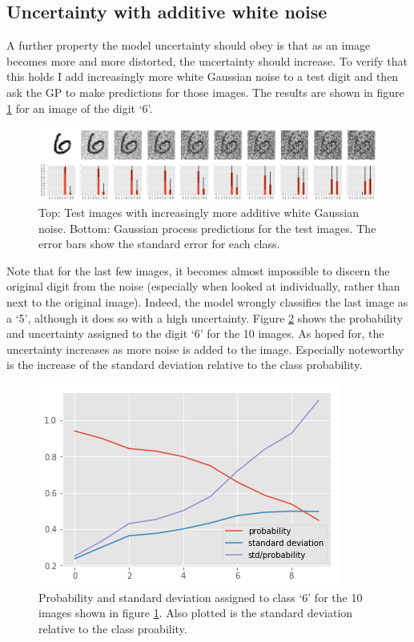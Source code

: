 \documentclass{article}
\begin{document}
\subsection{Uncertainty with additive white noise}
A further property the model uncertainty should obey is that as an image becomes more and more distorted, the uncertainty should increase. To verify that this holds I add increasingly more white Gaussian noise to a test digit and then ask the GP to make predictions for those images. The results are shown in figure \ref{fig/awgn_predictions} for an image of the digit `6'.
\begin{figure}
	\centering
	\includegraphics[width=1.0\textwidth]{awgn_predictions}
	\caption{Top: Test images with increasingly more additive white Gaussian noise. Bottom: Gaussian process predictions for the test images. The error bars show the standard error for each class.}
	\label{fig/awgn_predictions}
\end{figure}
Note that for the last few images, it becomes almost impossible to discern the original digit from the noise (especially when looked at individually, rather than next to the original image). Indeed, the model wrongly classifies the last image as a `5', although it does so with a high uncertainty. Figure \ref{fig/awgn_predictions_stds} shows the probability and uncertainty assigned to the digit `6' for the 10 images. As hoped for, the uncertainty increases as more noise is added to the image. Especially noteworthy is the increase of the standard deviation relative to the class probability.
\begin{figure}
	\centering
	\includegraphics[scale=0.4]{awgn_predictions_stds}
	\caption{Probability and standard deviation assigned to class `6' for the 10 images shown in figure \ref{fig/awgn_predictions}. Also plotted is the standard deviation relative to the class proability.}
	\label{fig/awgn_predictions_stds}
\end{figure}
\end{document}

